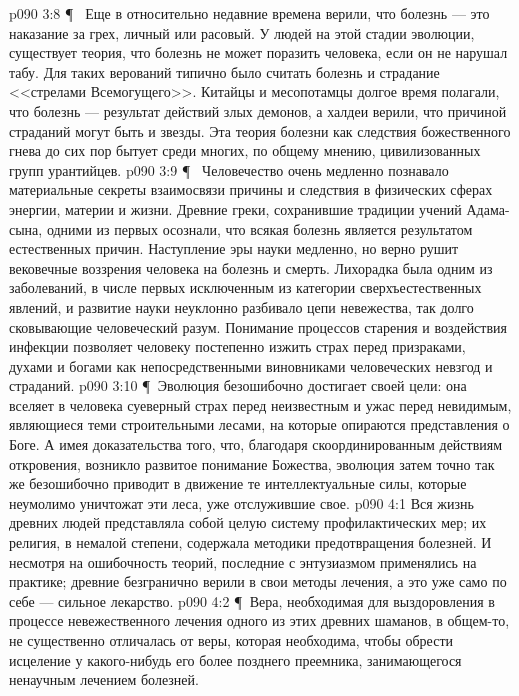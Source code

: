 \vs p090 3:8 \P\ \bibnobreakspace {} Еще в относительно недавние времена верили, что болезнь --- это наказание за грех, личный или расовый. У людей на этой стадии эволюции, существует теория, что болезнь не может поразить человека, если он не нарушал табу. Для таких верований типично было считать болезнь и страдание <<стрелами Всемогущего>>. Китайцы и месопотамцы долгое время полагали, что болезнь --- результат действий злых демонов, а халдеи верили, что причиной страданий могут быть и звезды. Эта теория болезни как следствия божественного гнева до сих пор бытует среди многих, по общему мнению, цивилизованных групп урантийцев.
\vs p090 3:9 \P\ \bibnobreakspace {} Человечество очень медленно познавало материальные секреты взаимосвязи причины и следствия в физических сферах энергии, материи и жизни. Древние греки, сохранившие традиции учений Адама\hyp{}сына, одними из первых осознали, что всякая болезнь является результатом естественных причин. Наступление эры науки медленно, но верно рушит вековечные воззрения человека на болезнь и смерть. Лихорадка была одним из заболеваний, в числе первых исключенным из категории сверхъестественных явлений, и развитие науки неуклонно разбивало цепи невежества, так долго сковывающие человеческий разум. Понимание процессов старения и воздействия инфекции позволяет человеку постепенно изжить страх перед призраками, духами и богами как непосредственными виновниками человеческих невзгод и страданий.
\vs p090 3:10 \P\ Эволюция безошибочно достигает своей цели: она вселяет в человека суеверный страх перед неизвестным и ужас перед невидимым, являющиеся теми строительными лесами, на которые опираются представления о Боге. А имея доказательства того, что, благодаря скоординированным действиям откровения, возникло развитое понимание Божества, эволюция затем точно так же безошибочно приводит в движение те интеллектуальные силы, которые неумолимо уничтожат эти леса, уже отслужившие свое.
\vs p090 4:1 Вся жизнь древних людей представляла собой целую систему профилактических мер; их религия, в немалой степени, содержала методики предотвращения болезней. И несмотря на ошибочность теорий, последние с энтузиазмом применялись на практике; древние безгранично верили в свои методы лечения, а это уже само по себе --- сильное лекарство.
\vs p090 4:2 \P\ Вера, необходимая для выздоровления в процессе невежественного лечения одного из этих древних шаманов, в общем\hyp{}то, не существенно отличалась от веры, которая необходима, чтобы обрести исцеление у какого\hyp{}нибудь его более позднего преемника, занимающегося ненаучным лечением болезней.
